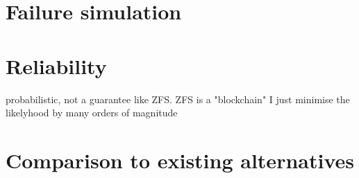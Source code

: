     \section{Failure simulation}

    \section{Reliability}

        probabilistic, not a guarantee like ZFS. ZFS is a "blockchain" I just
        minimise the likelyhood by many orders of magnitude

    \section{Comparison to existing alternatives}
